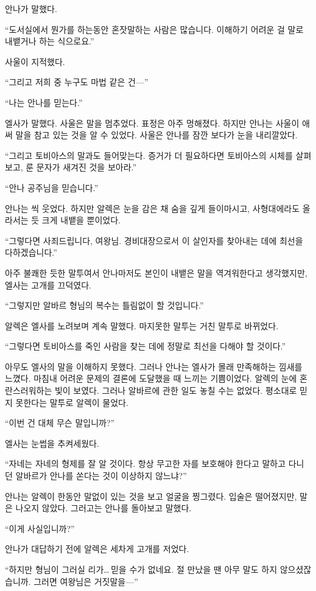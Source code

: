 안나가 말했다.

``도서실에서 뭔가를 하는동안 혼잣말하는 사람은 많습니다. 이해하기 어려운 걸 말로 내뱉거나 하는 식으로요.''

사울이 지적했다.

``그리고 저희 중 누구도 마법 같은 건—''

``나는 안나를 믿는다.''

엘사가 말했다. 사울은 말을 멈추었다. 표정은 아주 멍해졌다. 하지만 안나는 사울이 애써 말을 참고 있는 것을 알 수 있었다. 사울은 안나를 잠깐 보다가 눈을 내리깔았다.

``그리고 토비아스의 말과도 들어맞는다. 증거가 더 필요하다면 토비아스의 시체를 살펴보고, 룬 문자가 새겨진 것을 보아라.''

`` 안나 공주님을 믿습니다.''

안나는 씩 웃었다. 하지만 알렉은 눈을 감은 채 숨을 깊게 들이마시고, 사형대에라도 올라서는 듯 크게 내뱉을 뿐이었다.

``그렇다면 사죄드립니다, 여왕님. 경비대장으로서 이 살인자를 찾아내는 데에 최선을 다하겠습니다.''

아주 불쾌한 듯한 말투여서 안나마저도 본인이 내뱉은 말을 역겨워한다고 생각했지만, 엘사는 고개를 끄덕였다.

``그렇지만 알바르 형님의 복수는 틀림없이 할 것입니다.''

알렉은 엘사를 노려보며 계속 말했다. 마지못한 말투는 거친 말투로 바뀌었다.

``그렇다면 토비아스를 죽인 사람을 찾는 데에 정말로 최선을 다해야 할 것이다.''

아무도 엘사의 말을 이해하지 못했다. 그러나 안나는 엘사가 몰래 만족해하는 낌새를 느꼈다. 마침내 어려운 문제의 결론에 도달했을 때 느끼는 기쁨이었다. 알렉의 눈에 혼란스러워하는 빛이 보였다. 그러나 알바르에 관한 일도 놓칠 수는 없었다. 평소대로 믿지 못한다는 말투로 알렉이 물었다.

``이번 건 대체 무슨 말입니까?''

엘사는 눈썹을 추켜세웠다.

``자네는 자네의 형제를 잘 알 것이다. 항상 무고한 자를 보호해야 한다고 말하고 다니던 알바르가 안나를 쏜다는 것이 이상하지 않느냐?''

안나는 알렉이 한동안 말없이 있는 것을 보고 얼굴을 찡그렸다. 입술은 떨어졌지만, 말은 나오지 않았다. 그러고는 안나를 돌아보고 말했다.

``이게 사실입니까?''

안나가 대답하기 전에 알렉은 세차게 고개를 저었다.

``하지만 형님이 그러실 리가\ldots\,믿을 수가 없네요. 절 만났을 땐 아무 말도 하지 않으셨잖습니까. 그러면 여왕님은 거짓말을—''

